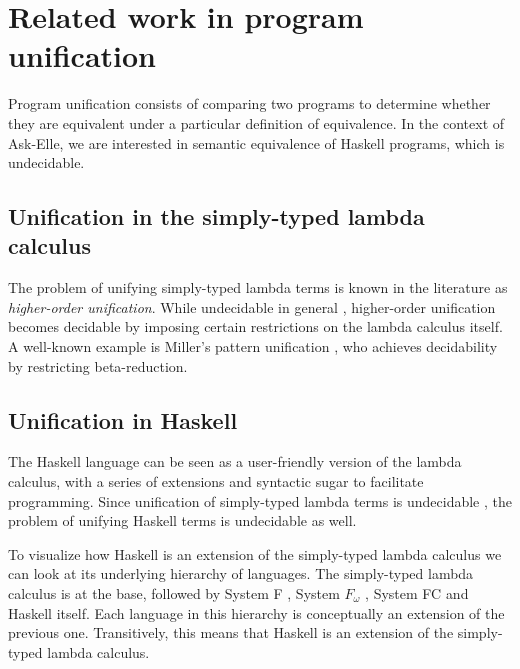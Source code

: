 




\section{Related work in program unification}
\label{sec:related-work-unification}

Program unification consists of comparing two programs to determine whether they are equivalent under a particular definition of equivalence. In the context of Ask-Elle, we are interested in semantic equivalence of Haskell programs, which is undecidable.

\subsection{Unification in the simply-typed lambda calculus}

The problem of unifying simply-typed lambda terms is known in the literature as \emph{higher-order unification}. While undecidable in general \cite{2013barendregt}, higher-order unification becomes decidable by imposing certain restrictions on the lambda calculus itself. A well-known example is Miller's pattern unification \cite{1991miller}, who achieves decidability by restricting beta-reduction.

\subsection{Unification in Haskell}

The Haskell language can be seen as a user-friendly version of the lambda calculus, with a series of extensions and syntactic sugar to facilitate programming. Since unification of simply-typed lambda terms is undecidable \cite{2013barendregt}, the problem of unifying Haskell terms is undecidable as well.

To visualize how Haskell is an extension of the simply-typed lambda calculus we can look at its underlying hierarchy of languages. The simply-typed lambda calculus is at the base, followed by System F \cite{2002pierce}, System $F_\omega$ \cite{2002pierce}, System FC \cite{2007systemfc} and Haskell itself. Each language in this hierarchy is conceptually an extension of the previous one. Transitively, this means that Haskell is an extension of the simply-typed lambda calculus.

